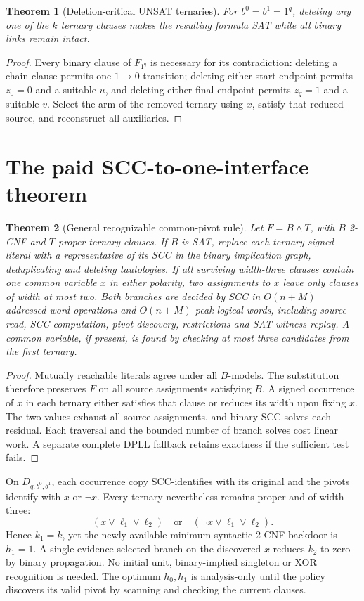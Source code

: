 \documentclass[11pt]{article}
\newtheorem{theorem}{Theorem}
\begin{document}
\begin{theorem}[Deletion-critical UNSAT ternaries]
For $b^0=b^1=1^q$, deleting any one of the $k$ ternary clauses makes
the resulting formula SAT while all binary links remain intact.
\end{theorem}
\begin{proof}
Every binary clause of $F_{1^q}$ is necessary for its contradiction:
deleting a chain clause permits one $1\to0$ transition; deleting
either start endpoint permits $z_0=0$ and a suitable $u$, and
deleting either final endpoint permits $z_q=1$ and a suitable $v$.
Select the arm of the removed ternary using $x$, satisfy that reduced
source, and reconstruct all auxiliaries.
\end{proof}

\section{The paid SCC-to-one-interface theorem}
\begin{theorem}[General recognizable common-pivot rule]
Let $F=B\land T$, with $B$ 2-CNF and $T$ proper ternary clauses. If $B$
is SAT, replace each ternary signed literal with a representative
of its SCC in the binary implication graph, deduplicating and deleting
tautologies. If all surviving width-three clauses contain one common
variable $x$ in either polarity, two assignments to $x$ leave
only clauses of width at most two. Both branches are decided by SCC
in $O(n+M)$ addressed-word operations and $O(n+M)$ peak logical words,
including source read, SCC computation, pivot discovery, restrictions
and SAT witness replay. A common variable, if present, is found by
checking at most three candidates from the first ternary.
\end{theorem}
\begin{proof}
Mutually reachable literals agree under all $B$-models. The
substitution therefore preserves $F$ on all source assignments
satisfying $B$. A signed occurrence of $x$ in each ternary either
satisfies that clause or reduces its width upon fixing $x$.
The two values exhaust all source assignments, and binary SCC solves
each residual. Each traversal and the bounded number of branch
solves cost linear work. A separate complete DPLL fallback retains
exactness if the sufficient test fails.
\end{proof}

On $D_{q,b^0,b^1}$, each occurrence copy SCC-identifies with its
original and the pivots identify with $x$ or $\neg x$.
Every ternary nevertheless remains proper and of width three:
\[
(x\vee\ell_1\vee\ell_2)\quad\text{or}\quad
(\neg x\vee\ell_1\vee\ell_2).
\]
Hence $k_1=k$, yet the newly available minimum syntactic
2-CNF backdoor is $h_1=1$. A single evidence-selected branch
on the discovered $x$ reduces $k_2$ to zero by binary propagation.
No initial unit, binary-implied singleton or XOR recognition is
needed. The optimum $h_0,h_1$ is analysis-only until the policy
discovers its valid pivot by scanning and checking the current clauses.
\end{document}
